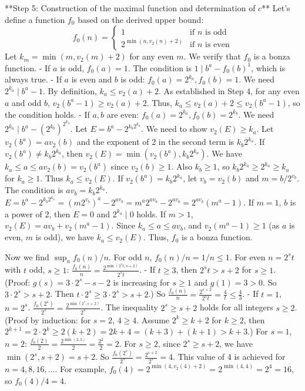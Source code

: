 \documentclass[12pt]{article}
\begin{document}
**Step 5: Construction of the maximal function and determination of $c$**
Let's define a function $f_0$ based on the derived upper bound:
$$ f_0(n) = \begin{cases} 1 & \text{if } n \text{ is odd} \\ 2^{\min(n, v_2(n)+2)} & \text{if } n \text{ is even} \end{cases} $$
Let $k_m = \min(m, v_2(m)+2)$ for any even $m$. We verify that $f_0$ is a bonza function.
-   If $a$ is odd, $f_0(a)=1$. The condition is $1 \mid b^a - f_0(b)^{1}$, which is always true.
-   If $a$ is even and $b$ is odd: $f_0(a)=2^{k_a}, f_0(b)=1$. We need $2^{k_a} \mid b^a-1$. By definition, $k_a \le v_2(a)+2$. As established in Step 4, for any even $a$ and odd $b$, $v_2(b^a-1) \ge v_2(a)+2$. Thus, $k_a \le v_2(a)+2 \le v_2(b^a-1)$, so the condition holds.
-   If $a, b$ are even: $f_0(a)=2^{k_a}, f_0(b)=2^{k_b}$. We need $2^{k_a} \mid b^a - (2^{k_b})^{2^{k_a}}$. Let $E = b^a - 2^{k_b 2^{k_a}}$. We need to show $v_2(E) \ge k_a$.
    Let $v_2(b^a) = a v_2(b)$ and the exponent of 2 in the second term is $k_b 2^{k_a}$.
    If $v_2(b^a) \ne k_b 2^{k_a}$, then $v_2(E) = \min(v_2(b^a), k_b 2^{k_a})$. We have $k_a \le a \le a v_2(b) = v_2(b^a)$ since $v_2(b) \ge 1$. Also $k_b \ge 1$, so $k_b 2^{k_a} \ge 2^{k_a} \ge k_a$ for $k_a \ge 1$. Thus $k_a \le v_2(E)$.
    If $v_2(b^a) = k_b 2^{k_a}$, let $v_b=v_2(b)$ and $m=b/2^{v_b}$. The condition is $a v_b = k_b 2^{k_a}$.
    $E = b^a - 2^{k_b 2^{k_a}} = (m 2^{v_b})^a - 2^{a v_b} = m^a 2^{a v_b} - 2^{a v_b} = 2^{a v_b}(m^a-1)$.
    If $m=1$, $b$ is a power of 2, then $E=0$ and $2^{k_a} \mid 0$ holds.
    If $m>1$, $v_2(E) = a v_b + v_2(m^a-1)$. Since $k_a \le a \le a v_b$, and $v_2(m^a-1) \ge 1$ (as $a$ is even, $m$ is odd), we have $k_a \le v_2(E)$.
    Thus, $f_0$ is a bonza function.

Now we find $\sup_{n} f_0(n)/n$. For odd $n$, $f_0(n)/n = 1/n \le 1$. For even $n=2^s t$ with $t$ odd, $s \ge 1$:
$\frac{f_0(n)}{n} = \frac{2^{\min(2^s t, s+2)}}{2^s t}$.
-   If $t \ge 3$, then $2^s t > s+2$ for $s \ge 1$. (Proof: $g(s)=3 \cdot 2^s - s - 2$ is increasing for $s \ge 1$ and $g(1)=3>0$. So $3 \cdot 2^s > s+2$. Then $t \cdot 2^s \ge 3 \cdot 2^s > s+2$.)
    So $\frac{f_0(n)}{n} = \frac{2^{s+2}}{2^s t} = \frac{4}{t} \le \frac{4}{3}$.
-   If $t=1$, $n=2^s$. $\frac{f_0(2^s)}{2^s} = \frac{2^{\min(2^s, s+2)}}{2^s}$.
    The inequality $2^s \ge s+2$ holds for all integers $s \ge 2$. (Proof by induction: for $s=2$, $4 \ge 4$. Assume $2^k \ge k+2$ for $k \ge 2$, then $2^{k+1}=2 \cdot 2^k \ge 2(k+2)=2k+4 = (k+3)+(k+1) > k+3$.)
    For $s=1$, $n=2$: $\frac{f_0(2)}{2} = \frac{2^{\min(2,3)}}{2} = \frac{2^2}{2} = 2$.
    For $s \ge 2$, since $2^s \ge s+2$, we have $\min(2^s, s+2) = s+2$. So $\frac{f_0(2^s)}{2^s} = \frac{2^{s+2}}{2^s} = 4$.
This value of 4 is achieved for $n=4, 8, 16, \dots$. For example, $f_0(4)=2^{\min(4, v_2(4)+2)} = 2^{\min(4,4)} = 2^4=16$, so $f_0(4)/4=4$.
\end{document}
